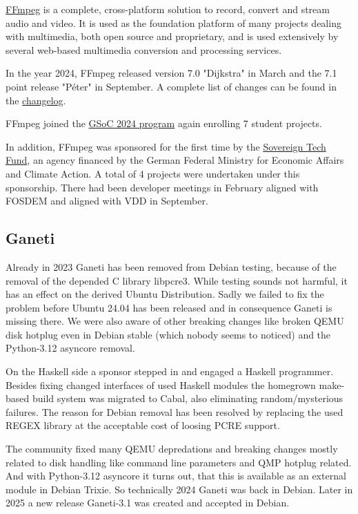 \documentclass[a4paper]{report}
\begin{document}
\href{https://www.ffmpeg.org}{FFmpeg} is a complete, cross-platform solution to record, convert and stream audio and video. It is used as the foundation platform of many projects dealing with multimedia, both open source and proprietary, and is used extensively by several web-based multimedia conversion and processing services.

In the year 2024, FFmpeg released version 7.0 "Dijkstra" in March and the 7.1 point release "Péter" in September. A complete list of changes can be found in the \href{https://git.ffmpeg.org/gitweb/ffmpeg.git/blob/HEAD:/Changelog}{changelog}.

FFmpeg joined the \href{https://summerofcode.withgoogle.com/programs/2024/organizations/ffmpeg}{GSoC 2024 program} again enrolling 7 student projects.

In addition, FFmpeg was sponsored for the first time by the \href{https://www.sovereign.tech/tech/ffmpeg}{Sovereign Tech Fund}, an agency financed by the German Federal Ministry for Economic Affairs and Climate Action. A total of 4 projects were undertaken under this sponsorship. There had been developer meetings in February aligned with FOSDEM and aligned with VDD in September.

\subsection{Ganeti}

Already in 2023 Ganeti has been removed from Debian testing, because of the removal of the depended C library libpcre3. While testing sounds not harmful, it has an effect on the derived Ubuntu Distribution. Sadly we failed to fix the problem before Ubuntu 24.04 has been released and in consequence Ganeti is missing there. We were also aware of other breaking changes like broken QEMU disk hotplug even in Debian stable (which nobody seems to noticed) and the Python-3.12 asyncore removal.

On the Haskell side a sponsor stepped in and engaged a Haskell programmer. Besides fixing changed interfaces of used Haskell modules the homegrown make-based build system was migrated to Cabal, also eliminating random/mysterious failures. The reason for Debian removal has been resolved by replacing the used REGEX library at the acceptable cost of loosing PCRE support.

The community fixed many QEMU depredations and breaking changes mostly related to disk handling like command line parameters and QMP hotplug related. And with Python-3.12 asyncore it turns out, that this is available as an external module in Debian Trixie. So technically 2024 Ganeti was back in Debian. Later in 2025 a new release Ganeti-3.1 was created and accepted in Debian.
\end{document}
